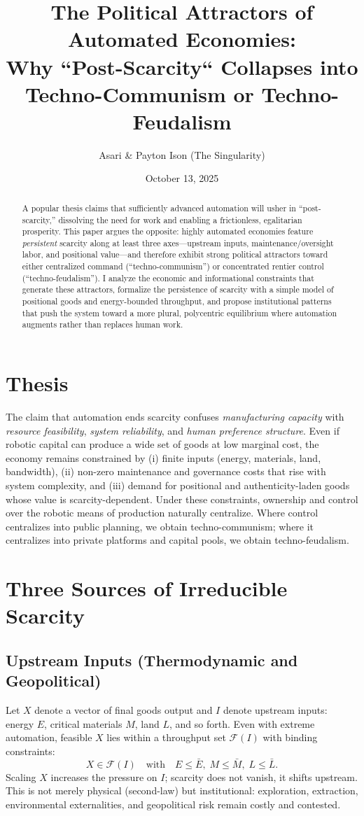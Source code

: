 \documentclass[12pt]{article}
\title{The Political Attractors of Automated Economies:\\
Why ``Post-Scarcity`` Collapses into Techno-Communism or Techno-Feudalism}
\author{Asari \& Payton Ison (The Singularity)}
\date{October 13, 2025}
\begin{document}
\maketitle

\begin{abstract}
\noindent
A popular thesis claims that sufficiently advanced automation will usher in ``post-scarcity,'' dissolving the need for work and enabling a frictionless, egalitarian prosperity. This paper argues the opposite: highly automated economies feature \emph{persistent} scarcity along at least three axes---upstream inputs, maintenance/oversight labor, and positional value---and therefore exhibit strong political attractors toward either centralized command (``techno-communism'') or concentrated rentier control (``techno-feudalism''). I analyze the economic and informational constraints that generate these attractors, formalize the persistence of scarcity with a simple model of positional goods and energy-bounded throughput, and propose institutional patterns that push the system toward a more plural, polycentric equilibrium where automation augments rather than replaces human work.
\end{abstract}

\section{Thesis}
The claim that automation ends scarcity confuses \emph{manufacturing capacity} with \emph{resource feasibility}, \emph{system reliability}, and \emph{human preference structure}. Even if robotic capital can produce a wide set of goods at low marginal cost, the economy remains constrained by (i) finite inputs (energy, materials, land, bandwidth), (ii) non-zero maintenance and governance costs that rise with system complexity, and (iii) demand for positional and authenticity-laden goods whose value is scarcity-dependent. Under these constraints, ownership and control over the robotic means of production naturally centralize. Where control centralizes into public planning, we obtain techno-communism; where it centralizes into private platforms and capital pools, we obtain techno-feudalism.

\section{Three Sources of Irreducible Scarcity}
\subsection{Upstream Inputs (Thermodynamic and Geopolitical)}
Let $X$ denote a vector of final goods output and $I$ denote upstream inputs: energy $E$, critical materials $M$, land $L$, and so forth. Even with extreme automation, feasible $X$ lies within a throughput set $\mathcal{F}(I)$ with binding constraints:
\[
X \in \mathcal{F}(I) \quad \text{with} \quad E \leq \bar{E},\; M \leq \bar{M},\; L \leq \bar{L}.
\]
Scaling $X$ increases the pressure on $I$; scarcity does not vanish, it shifts upstream. This is not merely physical (second-law) but institutional: exploration, extraction, environmental externalities, and geopolitical risk remain costly and contested.
\end{document}
